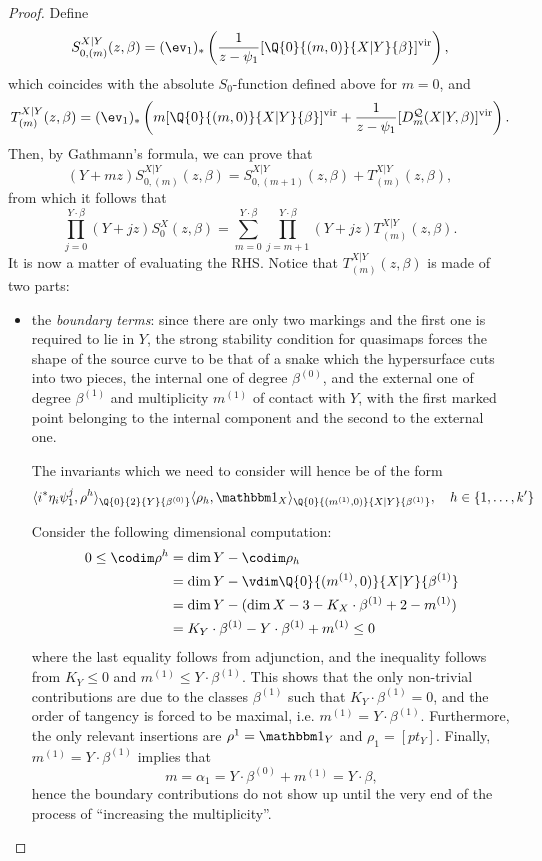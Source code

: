 \begin{proof}

Define
 \[
  S_{0,(m)}^{X|Y}(z,\beta)=(\ev_1)_*\left(\frac{1}{z-\psi_1}[\Q{0}{(m,0)}{X|Y}{\beta}]^\text{vir}\right),
 \]
which coincides with the absolute $S_0$-function defined above for $m=0$, and
\[
 T_{(m)}^{X|Y}(z,\beta)=(\ev_1)_*\left(m[\Q{0}{(m,0)}{X|Y}{\beta}]^\text{vir}+\frac{1}{z-\psi_1}[D_m^{\mathcal Q}(X|Y,\beta)]^\text{vir}\right).
\]
Then, by Gathmann's formula, we can prove that
\begin{equation}\label{eqn:G}
 (Y+mz) S_{0,(m)}^{X|Y}(z,\beta) = S_{0,(m+1)}^{X|Y}(z,\beta)+ T_{(m)}^{X|Y}(z,\beta),
\end{equation}
from which it follows that
\[
 \prod_{j=0}^{Y\cdot\beta}(Y+jz) S_0^X(z,\beta) = \sum_{m=0}^{Y\cdot\beta}\prod_{j=m+1}^{Y\cdot\beta}(Y+jz)T_{(m)}^{X|Y}(z,\beta).
\]
It is now a matter of evaluating the RHS. Notice that $T_{(m)}^{X|Y}(z,\beta)$ is made of two parts:
\begin{itemize}[leftmargin=*]
 \item the \emph{boundary terms}: since there are only two markings and the first one is required to lie in $Y$, the strong stability condition for quasimaps forces the shape of the source curve to be that of a snake which the hypersurface cuts into two pieces, the internal one of degree $\beta^{(0)}$, and the external one of degree $\beta^{(1)}$ and multiplicity $m^{(1)}$ of contact with $Y$, with the first marked point belonging to the internal component and the second to the external one.
 
 The invariants which we need to consider will hence be of the form
 \[
  \langle i^*\eta_i\psi_1^j,\rho^h\rangle_{\Q{0}{2}{Y}{\beta^{(0)}}}\langle \rho_h,\mathbbm 1_{X}\rangle_{\Q{0}{(m^{(1)},0)}{X|Y}{\beta^{(1)}}}, \quad h\in\{1,\ldots,k'\}
 \]
 
 Consider the following dimensional computation:
\begin{align*}
 0\leq \codim \rho^h &= \dim Y-\codim \rho_h \\
 &= \dim Y-\vdim \Q{0}{(m^{(1)},0)}{X|Y}{\beta^{(1)}} \\
 &= \dim Y-(\dim X-3-K_{X}\cdot \beta^{(1)}+2-m^{(1)})\\
 &= K_Y \cdot \beta^{(1)}-Y \cdot \beta^{(1)}+m^{(1)}\leq 0
\end{align*}
 where the last equality follows from adjunction, and the inequality follows from $K_Y\leq 0$ and $m^{(1)}\leq Y \cdot \beta^{(1)}$.
This shows that the only non-trivial contributions are due to the classes $\beta^{(1)}$ such that $K_Y \cdot \beta^{(1)}=0$, and the order of tangency is forced to be maximal, i.e. $m^{(1)}=Y \cdot \beta^{(1)}$. Furthermore, the only relevant insertions are $\rho^1=\mathbbm 1_Y$ and $\rho_1=[pt_Y]$. Finally, $m^{(1)}=Y \cdot \beta^{(1)}$ implies that
\[
 m=\alpha_1=Y \cdot \beta^{(0)}+m^{(1)}=Y \cdot \beta,
\]
hence the boundary contributions do not show up until the very end of the process of ``increasing the multiplicity''.


\end{itemize}
\end{proof}
